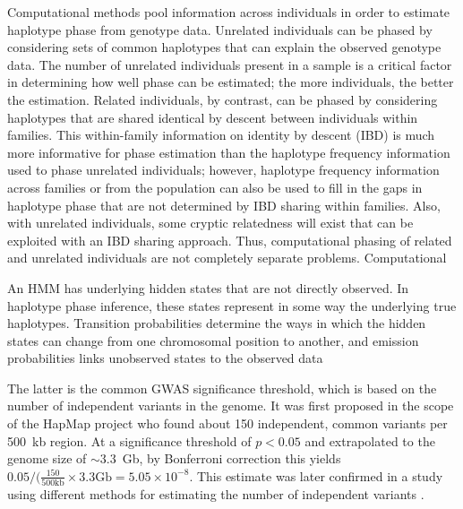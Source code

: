 Computational methods pool information across individuals in order to estimate haplotype phase from genotype data. Unrelated individuals can be phased by considering sets of common haplotypes that can explain the observed genotype data. The number of unrelated individuals present in a sample is a critical factor in determining how well phase can be estimated; the more individuals, the better the estimation. Related individuals, by contrast, can be phased by considering haplotypes that are shared identical by descent between individuals within families. This within-family information on identity by descent (IBD) is much more informative for phase estimation than the haplotype frequency information used to phase unrelated individuals; however, haplotype frequency information across families or from the population can also be used to fill in the gaps in haplotype phase that are not determined by IBD sharing within families. Also, with unrelated individuals, some cryptic relatedness will exist that can be exploited with an IBD sharing approach. Thus, computational phasing of related and unrelated individuals are not completely separate problems.
Computational

An HMM has underlying hidden states that are not directly observed. In haplotype phase inference, these states represent in some way the underlying true haplotypes. Transition probabilities determine the ways in which the hidden states can change from one chromosomal position to another, and emission probabilities links unobserved states to the observed data


The latter is the common GWAS significance threshold, which is based on the number of independent variants in the genome. It was first proposed in the scope of the HapMap project \citeyear{HapMap2005} who found about \num{150} independent, common variants per \num{500}~kb region. At a significance threshold of \(p < 0.05\) and extrapolated to the genome size of \(\sim 3.3\)~Gb, by Bonferroni correction this yields  \(0.05/(\frac{150}{500\text{kb}} \times 3.3 \text{Gb}= 5.05 \times 10^{-8}\). This estimate was later confirmed in a study using different methods for estimating the number of independent variants \citep{Fadista2016}.


